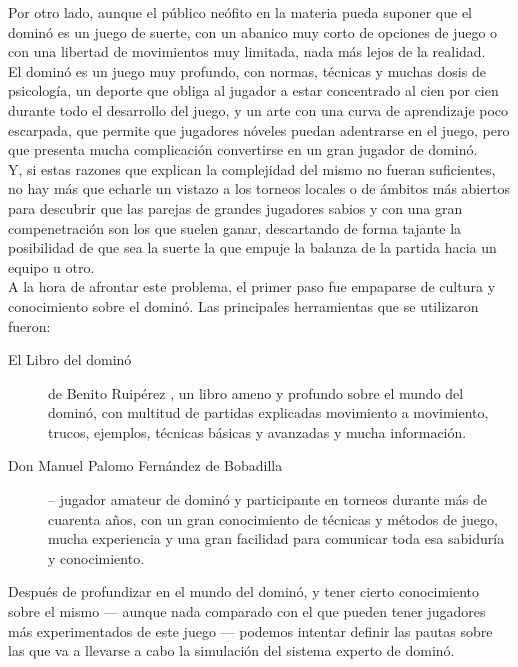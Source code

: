 Por otro lado, aunque el público neófito en la materia pueda suponer que el dominó es un juego de suerte, con un
abanico muy corto de opciones de juego o con una libertad de movimientos muy limitada, nada más lejos de la realidad. \\

El dominó es un juego muy profundo, con normas, técnicas y muchas dosis de psicología, un deporte que obliga al
jugador a estar concentrado al cien por cien durante todo el desarrollo del juego, y un arte con una curva de
aprendizaje poco escarpada, que permite que jugadores nóveles puedan adentrarse en el juego, pero que presenta
mucha complicación convertirse en un gran jugador de dominó. \\

Y, si estas razones que explican la complejidad del mismo no fueran suficientes, no hay más que echarle un vistazo
a los torneos locales o de ámbitos más abiertos para descubrir que las parejas de grandes jugadores sabios y con
una gran compenetración son los que suelen ganar, descartando de forma tajante la posibilidad de que sea la suerte
la que empuje la balanza de la partida hacia un equipo u otro. \\

A la hora de afrontar este problema, el primer paso fue empaparse de cultura y conocimiento sobre el dominó. Las
principales herramientas que se utilizaron fueron:

\begin{description}
    \item[El Libro del dominó] de Benito Ruipérez \cite{mora90}, un libro ameno y profundo sobre el mundo del dominó,
        con multitud de partidas explicadas movimiento a movimiento, trucos, ejemplos, técnicas básicas y avanzadas y
        mucha información.
    \item[Don Manuel Palomo Fernández de Bobadilla] -- jugador amateur de dominó y participante en torneos durante más de cuarenta
        años, con un gran conocimiento de técnicas y métodos de juego, mucha experiencia y una gran facilidad para
        comunicar toda esa sabiduría y conocimiento.
\end{description}

Después de profundizar en el mundo del dominó, y tener cierto conocimiento sobre el mismo --- aunque nada comparado
con el que pueden tener jugadores más experimentados de este juego --- podemos intentar definir las pautas sobre
las que va a llevarse a cabo la simulación del sistema experto de dominó. \\

